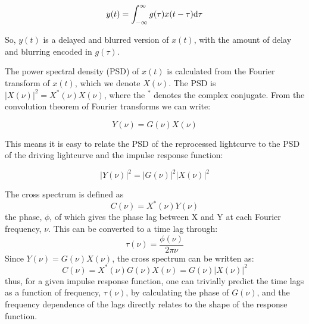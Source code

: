 \documentclass[11pt,letterpaper]{article}
\begin{document}
\begin{equation}
y(t) = \int_{-\infty}^{\infty} g(\tau) x(t-\tau)  {\rm d}\tau
\end{equation} 

So, $y(t)$ is a delayed and blurred version of $x(t)$, with the amount of delay and blurring encoded in $g(\tau)$.

The power spectral density (PSD) of $x(t)$ is calculated from the Fourier transform of $x(t)$, which we denote $X(\nu)$.  The PSD is $|X(\nu)|^2 = X^*(\nu)X(\nu)$, where the $^*$ denotes the complex conjugate.  From the convolution theorem of Fourier transforms we can write:

\begin{equation}
Y(\nu) = G(\nu) X(\nu)
\end{equation}

This means it is easy to relate the PSD of the reprocessed lightcurve to the PSD of the driving lightcurve and the impulse response function:

\begin{equation}
|Y(\nu)|^2 = |G(\nu)|^2 |X(\nu)|^2
\end{equation}

The cross spectrum is defined as
\begin{equation}
C(\nu) = X^*(\nu) Y(\nu)
\end{equation}
the phase, $\phi$, of which gives the phase lag between X and Y at each Fourier frequency, $\nu$.  This can be converted to a time lag through: 
\begin{equation}
\tau(\nu) = \frac{\phi(\nu)}{2\pi\nu}
\end{equation}
Since $Y(\nu) = G(\nu) X(\nu)$,  the cross spectrum can be written as:
\begin{equation}
C(\nu) = X^*(\nu) G(\nu) X(\nu) =  G(\nu) |X(\nu)|^2 
\end{equation}
thus, for a given impulse response function, one can trivially predict the time lags as a function of frequency, $\tau(\nu)$, by calculating the phase of $G(\nu)$, and the frequency dependence of the lags directly relates to the shape of the response function.
\end{document}
